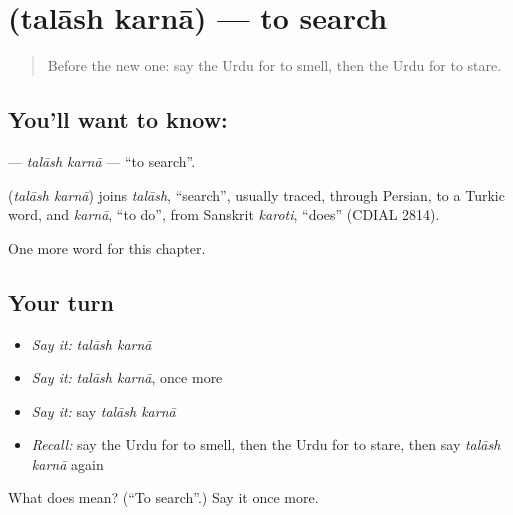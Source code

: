 \section[\texorpdfstring{\ur{تلاش} \ur{کرنا} (talāsh karnā)}{تلاش کرنا (talāsh karnā)}]{  (talāsh karnā) — to search}

\label{lesson:UR-C239-talash-karna}



\begin{quote}
Before the new one: say the Urdu for to smell, then the Urdu for to stare.
\end{quote}

\subsection*{You'll want to know:  }
\textbf{ } — \emph{talāsh karnā} — \textquotedblleft{}to search\textquotedblright{}.

\begin{cousinweb}
\textbf{ } (\emph{talāsh karnā}) joins \emph{talāsh}, \textquotedblleft{}search\textquotedblright{}, usually traced, through Persian, to a Turkic word, and \emph{karnā}, \textquotedblleft{}to do\textquotedblright{}, from Sanskrit \emph{karoti}, \textquotedblleft{}does\textquotedblright{} (CDIAL 2814).
\end{cousinweb}

\begin{grammarlens}[title={What you've built}]
One more word for this chapter.
\end{grammarlens}

\subsection*{Your turn}
\begin{itemize}
\raggedright
  \item \emph{Say it:} \emph{talāsh karnā}
  \item \emph{Say it:} \emph{talāsh karnā}, once more
  \item \emph{Say it:} say \emph{talāsh karnā}
  \item \emph{Recall:} say the Urdu for to smell, then the Urdu for to stare, then say \emph{talāsh karnā} again
\end{itemize}

\begin{tcolorbox}[breakable,colback=teal!4,colframe=teal!35!black,title={Before you move on}]
What does   mean? (\textquotedblleft{}To search\textquotedblright{}.) Say it once more.
\end{tcolorbox}
